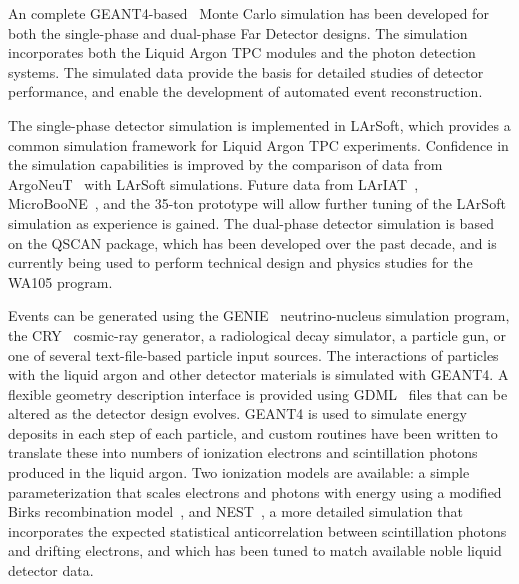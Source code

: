 
%
%
%

An complete GEANT4-based~\cite{geant4} Monte Carlo simulation has been 
developed for both the single-phase and dual-phase Far Detector designs.
The simulation incorporates both the Liquid Argon TPC modules
and the photon detection systems. The simulated data provide
the basis for detailed studies of detector performance, 
and enable the development of automated event reconstruction.

The single-phase detector simulation is implemented in LArSoft,
which provides a common simulation framework for Liquid Argon TPC experiments.
Confidence in the simulation capabilities is improved by
the comparison of data from ArgoNeuT~\cite{argoneut} with LArSoft
simulations.  Future data from LArIAT~\cite{lariat},
MicroBooNE~\cite{microboone}, and the 35-ton prototype will allow
further tuning of the LArSoft simulation as experience is gained.
The dual-phase detector simulation is based on the QSCAN package,
which has been developed over the past decade, and is currently
being used to perform technical design and physics studies for
the WA105 program.


Events can be generated using the GENIE~\cite{genie} neutrino-nucleus
simulation program, the CRY~\cite{cry} cosmic-ray generator, a
radiological decay simulator, a particle gun, or one of several
text-file-based particle input sources.  The interactions of particles
with the liquid argon and other detector materials is simulated with
GEANT4.  A flexible geometry description interface is provided using
GDML~\cite{gdml} files that can be altered as the detector design
evolves.  GEANT4 is used to simulate energy deposits in each step of
each particle, and custom routines have been written to translate
these into numbers of ionization electrons and scintillation photons
produced in the liquid argon.  Two ionization models are available: a
simple parameterization that scales electrons and photons with energy
using a modified Birks recombination model~\cite{birks}, and
NEST~\cite{nest}, a more detailed simulation that incorporates the
expected statistical anticorrelation between scintillation photons and
drifting electrons, and which has been tuned to match available noble
liquid detector data.


